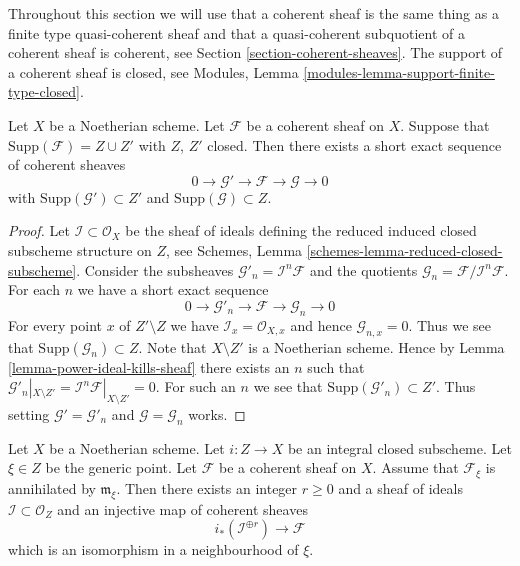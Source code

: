 \medskip\noindent
Throughout this section we will use that a coherent sheaf is the
same thing as a finite type quasi-coherent sheaf and that a
quasi-coherent subquotient of a coherent sheaf is coherent, see
Section \ref{section-coherent-sheaves}.
The support of a coherent sheaf is closed, see
Modules, Lemma \ref{modules-lemma-support-finite-type-closed}.

\begin{lemma}
\label{lemma-prepare-filter-support}
Let $X$ be a Noetherian scheme.
Let $\mathcal{F}$ be a coherent sheaf on $X$.
Suppose that $\text{Supp}(\mathcal{F}) = Z \cup Z'$ with $Z$, $Z'$ closed.
Then there exists a short exact sequence of coherent sheaves
$$
0 \to \mathcal{G}' \to \mathcal{F} \to \mathcal{G} \to 0
$$
with $\text{Supp}(\mathcal{G}') \subset Z'$ and
$\text{Supp}(\mathcal{G}) \subset Z$.
\end{lemma}

\begin{proof}
Let $\mathcal{I} \subset \mathcal{O}_X$ be the sheaf of ideals
defining the reduced induced closed subscheme structure on $Z$, see
Schemes, Lemma \ref{schemes-lemma-reduced-closed-subscheme}.
Consider the subsheaves
$\mathcal{G}'_n = \mathcal{I}^n\mathcal{F}$ and the
quotients $\mathcal{G}_n = \mathcal{F}/\mathcal{I}^n\mathcal{F}$.
For each $n$ we have a short exact sequence
$$
0 \to \mathcal{G}'_n \to \mathcal{F} \to \mathcal{G}_n \to 0
$$
For every point $x$ of $Z' \setminus Z$ we have
$\mathcal{I}_x = \mathcal{O}_{X, x}$
and hence $\mathcal{G}_{n, x} = 0$. Thus we see that
$\text{Supp}(\mathcal{G}_n) \subset Z$. Note that $X \setminus Z'$
is a Noetherian scheme. Hence by Lemma \ref{lemma-power-ideal-kills-sheaf}
there exists an $n$ such that
$\mathcal{G}'_n|_{X \setminus Z'} =
\mathcal{I}^n\mathcal{F}|_{X \setminus Z'} = 0$.
For such an $n$ we see that $\text{Supp}(\mathcal{G}'_n) \subset Z'$.
Thus setting
$\mathcal{G}' = \mathcal{G}'_n$ and $\mathcal{G} = \mathcal{G}_n$
works.
\end{proof}

\begin{lemma}
\label{lemma-prepare-filter-irreducible}
Let $X$ be a Noetherian scheme.
Let $i : Z \to X$ be an integral closed subscheme.
Let $\xi \in Z$ be the generic point.
Let $\mathcal{F}$ be a coherent sheaf on $X$.
Assume that $\mathcal{F}_\xi$ is annihilated by
$\mathfrak m_\xi$. Then there exists an integer
$r \geq 0$ and a sheaf of ideals $\mathcal{I} \subset \mathcal{O}_Z$
and an injective map of coherent sheaves
$$
i_*\left(\mathcal{I}^{\oplus r}\right) \to \mathcal{F}
$$
which is an isomorphism in a neighbourhood of $\xi$.
\end{lemma}

